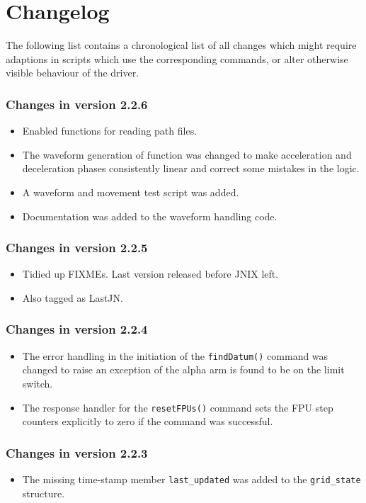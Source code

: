 \documentclass[fontsize=12,a4paper]{scrreprt}
\begin{document}
\chapter{Changelog}
\label{sec:changelog}


The following list contains a chronological list of all changes which
might require adaptions in scripts which use the corresponding
commands, or alter otherwise visible behaviour of the driver.

\subsection*{Changes in version 2.2.6}
\begin{itemize}
\item Enabled functions for reading path files.
\item The waveform generation of function was
  changed to make acceleration and deceleration phases consistently
  linear and correct some mistakes in the logic.
\item A waveform and movement test script was added.
\item Documentation was added to the waveform handling code.
\end{itemize}

\subsection*{Changes in version 2.2.5}
\begin{itemize}
\item Tidied up FIXMEs. Last version released before
  JNIX left.
\item Also tagged as LastJN.
\end{itemize}

\subsection*{Changes in version 2.2.4}
\begin{itemize}
\item The error handling in the initiation of
  the \texttt{findDatum()} command was changed
  to raise an exception of the alpha arm is
  found to be on the limit switch.
\item The response handler for the \texttt{resetFPUs()} command sets
  the FPU step counters explicitly to zero if the command was
  successful.
\end{itemize}


\subsection*{Changes in version 2.2.3}
\begin{itemize}
\item The missing time-stamp member \texttt{last\_updated} was added
  to the \texttt{grid\_state} structure.
\end{itemize}
\end{document}
